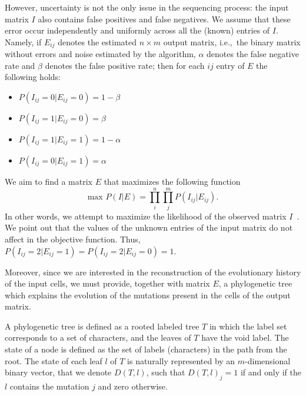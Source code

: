 \documentclass[a4paper,USenglish]{article}
\newcommand{\ie}{i.e.,~}
\theoremstyle{definition}
\begin{document}
However, uncertainty is not the only issue in the sequencing process:
the input matrix $I$ also contains false positives and false negatives. 
We assume that these error occur independently and uniformly across 
all the (known) entries of $I$. 
Namely, if $E_{ij}$ denotes the estimated $n\times m$ output matrix, \ie the binary matrix without errors and noise estimated by the algorithm,
$\alpha$ denotes the false negative rate and $\beta$ denotes the false positive rate; then for each $ij$ entry of $E$ the following holds:
\begin{itemize}
    \item $P(I_{ij} = 0|E_{ij} = 0) = 1- \beta$
    \item $P(I_{ij} = 1|E_{ij} = 0) = \beta$
    \item $P(I_{ij} = 1|E_{ij} = 1) = 1- \alpha$
    \item $P(I_{ij} = 0|E_{ij} = 1) = \alpha$
\end{itemize}

We aim to find a matrix $E$ that maximizes the following function 
$$
    \mbox{max } P(I|E) = \prod_{i}^{n} \prod_{j}^{m} P(I_{ij}|E_{ij}).
$$
In other words, we attempt to maximize the likelihood of the observed matrix $I$~\cite{Jahn2016}.
We point out that the values of the unknown entries of the input matrix 
do not affect in the objective function.
Thus, $P(I_{ij} = 2|E_{ij} = 1) = P(I_{ij} = 2|E_{ij} = 0) = 1$.

Moreover, since we are interested in the reconstruction of the evolutionary history 
of the input cells, we must provide, together with
matrix $E$, a phylogenetic tree which explains the evolution 
of the mutations present in the cells of the output matrix.

A phylogenetic tree is defined as a rooted labeled tree $T$ in 
which the label set corresponds to a set of characters, and the 
leaves of $T$ have the void label.
The state of a node is defined as the set of 
labels (characters) in the path from the root.
The state of each leaf $l$ of $T$ is naturally
represented by an $m$-dimensional binary vector, that
we denote $D(T,l)$, such that $D(T,l)_j=1$ if and
only if the $l$ contains the mutation $j$ and zero otherwise.
\end{document}

